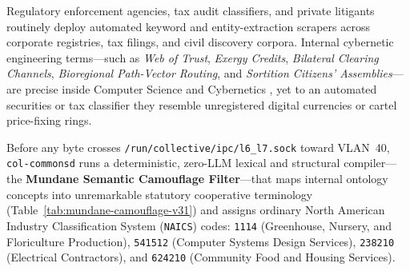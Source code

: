Regulatory enforcement agencies, tax audit classifiers, and private litigants routinely deploy automated keyword and entity-extraction scrapers across corporate registries, tax filings, and civil discovery corpora. Internal cybernetic engineering terms---such as \emph{Web of Trust}, \emph{Exergy Credits}, \emph{Bilateral Clearing Channels}, \emph{Bioregional Path-Vector Routing}, and \emph{Sortition Citizens' Assemblies}---are precise inside Computer Science and Cybernetics \parencite{beer1972,ostrom1990}, yet to an automated securities or tax classifier they resemble unregistered digital currencies or cartel price-fixing rings.

Before any byte crosses \texttt{/run/collective/ipc/l6\_l7.sock} toward VLAN~40, \texttt{col-commonsd} runs a deterministic, zero-LLM lexical and structural compiler---the \textbf{Mundane Semantic Camouflage Filter}---that maps internal ontology concepts into unremarkable statutory cooperative terminology (Table~\ref{tab:mundane-camouflage-v31}) and assigns ordinary North American Industry Classification System (\texttt{NAICS}) codes: \texttt{1114} (Greenhouse, Nursery, and Floriculture Production), \texttt{541512} (Computer Systems Design Services), \texttt{238210} (Electrical Contractors), and \texttt{624210} (Community Food and Housing Services).

